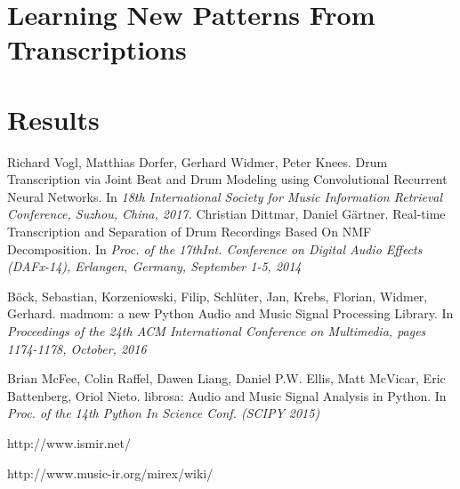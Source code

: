 \documentclass[10pt]{article}
\begin{document}
\section{Learning New Patterns From Transcriptions}

\section{Results}
\begin{thebibliography}{9}
Richard Vogl, Matthias Dorfer, Gerhard Widmer, Peter Knees.  
Drum Transcription via Joint Beat and Drum Modeling using Convolutional Recurrent Neural Networks. In
\textit{18th International Society for Music Information Retrieval Conference, Suzhou, China, 2017.}
Christian Dittmar, Daniel Gärtner.
Real-time Transcription and Separation of Drum Recordings Based On NMF Decomposition. In
\textit{Proc. of the 17thInt. Conference on Digital Audio Effects (DAFx-14), Erlangen, Germany, September 1-5, 2014}

 {B{\"o}ck, Sebastian, Korzeniowski, Filip, Schl{\"u}ter, Jan, Krebs, Florian, Widmer, Gerhard}.
 madmom: a new Python Audio and Music Signal Processing Library. In
\textit{Proceedings of the 24th ACM International Conference on
   Multimedia, pages 1174-1178, October, 2016}
   
Brian McFee, Colin Raffel, Dawen Liang, Daniel P.W. Ellis, Matt McVicar, Eric Battenberg, Oriol Nieto. 
librosa: Audio and Music Signal Analysis in Python. In
\textit{Proc. of the 14th Python In Science Conf. (SCIPY 2015)}

http://www.ismir.net/

http://www.music-ir.org/mirex/wiki/

\end{thebibliography}
\end{document}
